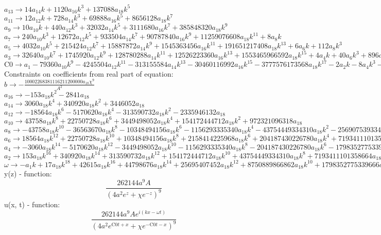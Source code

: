 \documentclass[12pt,a4paper,draft]{article}
\begin{document}
$a_{13}\to 14 a_{14} k+1120 a_{16} k^3+137088 a_{18} k^5$\\
$a_{11}\to 12 a_{12} k+728 a_{14} k^3+69888 a_{16} k^5+8656128 a_{18} k^7$\\
$a_{9}\to 10 a_{10} k+440 a_{12} k^3+32032 a_{14} k^5+3111680 a_{16} k^7+385848320 a_{18} k^9$\\
$a_{7}\to 240 a_{10} k^3+12672 a_{12} k^5+933504 a_{14} k^7+90787840 a_{16} k^9+11259076608 a_{18} k^{11}+8 a_{8} k$\\
$a_{5}\to 4032 a_{10} k^5+215424 a_{12} k^7+15887872 a_{14} k^9+1545363456 a_{16} k^{11}+191651217408 a_{18} k^{13}+6 a_{6} k+112 a_{8} k^3$\\
$a_{3}\to 32640 a_{10} k^7+1745920 a_{12} k^9+128780288 a_{14} k^{11}+12526223360 a_{16} k^{13}+1553465966592 a_{18} k^{15}+4 a_{4} k+40 a_{6} k^3+896 a_{8} k^5$\\
$\text{C0}\to a_{1}-79360 a_{10} k^9-4245504 a_{12} k^{11}-313155584 a_{14} k^{13}-30460116992 a_{16} k^{15}-3777576173568 a_{18} k^{17}-2 a_{2} k-8 a_{4} k^3-96 a_{6} k^5-2176 a_{8} k^7$\\
Constraints on coefficients from real part of equation:
\\$b\to -\frac{10002268381116211200000 a_{18} \chi ^9}{A^2}$\\
$a_{16}\to -153 a_{18} k^2-2841 a_{18}$\\
$a_{14}\to 3060 a_{18} k^4+340920 a_{18} k^2+3446052 a_{18}$\\
$a_{12}\to -18564 a_{18} k^6-5170620 a_{18} k^4-313590732 a_{18} k^2-2335946132 a_{18}$\\
$a_{10}\to 43758 a_{18} k^8+22750728 a_{18} k^6+3449498052 a_{18} k^4+154172444712 a_{18} k^2+972321096318 a_{18}$\\
$a_{8}\to -43758 a_{18} k^{10}-36563670 a_{18} k^8-10348494156 a_{18} k^6-1156293335340 a_{18} k^4-43754449334310 a_{18} k^2-256907539334238 a_{18}$\\
$a_{6}\to 18564 a_{18} k^{12}+22750728 a_{18} k^{10}+10348494156 a_{18} k^8+2158414225968 a_{18} k^6+204187430226780 a_{18} k^4+7193411101358664 a_{18} k^2+42942368606859604 a_{18}$\\
$a_{4}\to -3060 a_{18} k^{14}-5170620 a_{18} k^{12}-3449498052 a_{18} k^{10}-1156293335340 a_{18} k^8-204187430226780 a_{18} k^6-17983527753396660 a_{18} k^4-644135529102894060 a_{18} k^2-4362858052479448164 a_{18}$\\
$a_{2}\to 153 a_{18} k^{16}+340920 a_{18} k^{14}+313590732 a_{18} k^{12}+154172444712 a_{18} k^{10}+43754449334310 a_{18} k^8+7193411101358664 a_{18} k^6+644135529102894060 a_{18} k^4+26177148314876688984 a_{18} k^2+243547065371503190025 a_{18}$\\
$\omega \to -a_{1} k+17 a_{18} k^{18}+42615 a_{18} k^{16}+44798676 a_{18} k^{14}+25695407452 a_{18} k^{12}+8750889866862 a_{18} k^{10}+1798352775339666 a_{18} k^8+214711843034298020 a_{18} k^6+13088574157438344492 a_{18} k^4+243547065371503190025 a_{18} k^2-5669162887825953140625 a_{18}$\\


y(z) - function:
$$
\frac{262144 a^9 A}{\left(4 a^2 e^z+\chi  e^{-z}\right)^9}
$$
u(x, t) - function:
$$
\frac{262144 a^9 A e^{i (k x-\omega  t)}}{\left(4 a^2 e^{\text{C0} t+x}+\chi  e^{-\text{C0} t-x}\right)^9}
$$
\end{document}
